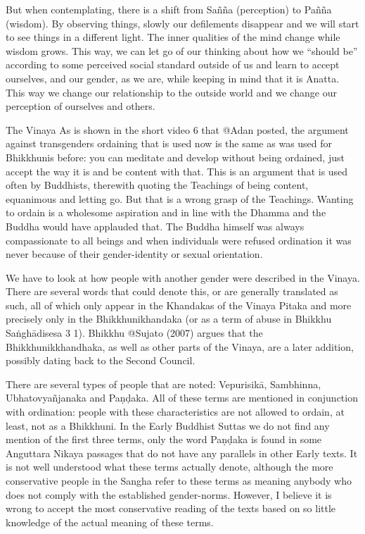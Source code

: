 But when contemplating, there is a shift from Sañña (perception) to Pañña (wisdom). By observing things, slowly our defilements disappear and we will start to see things in a different light. The inner qualities of the mind change while wisdom grows. This way, we can let go of our thinking about how we “should be” according to some perceived social standard outside of us and learn to accept ourselves, and our gender, as we are, while keeping in mind that it is Anatta. This way we change our relationship to the outside world and we change our perception of ourselves and others.

The Vinaya
As is shown in the short video 6 that @Adan posted, the argument against transgenders ordaining that is used now is the same as was used for Bhikkhunis before: you can meditate and develop without being ordained, just accept the way it is and be content with that. This is an argument that is used often by Buddhists, therewith quoting the Teachings of being content, equanimous and letting go. But that is a wrong grasp of the Teachings. Wanting to ordain is a wholesome aspiration and in line with the Dhamma and the Buddha would have applauded that. The Buddha himself was always compassionate to all beings and when individuals were refused ordination it was never because of their gender-identity or sexual orientation.

We have to look at how people with another gender were described in the Vinaya. There are several words that could denote this, or are generally translated as such, all of which only appear in the Khandakas of the Vinaya Pitaka and more precisely only in the Bhikkhunikhandaka (or as a term of abuse in Bhikkhu Saṅghādisesa 3 1). Bhikkhu @Sujato (2007) argues that the Bhikkhunikkhandhaka, as well as other parts of the Vinaya, are a later addition, possibly dating back to the Second Council.

There are several types of people that are noted: Vepurisikā, Sambhinna, Ubhatovyañjanaka and Paṇḍaka.
All of these terms are mentioned in conjunction with ordination: people with these characteristics are not allowed to ordain, at least, not as a Bhikkhuni. In the Early Buddhist Suttas we do not find any mention of the first three terms, only the word Paṇḍaka is found in some Anguttara Nikaya passages that do not have any parallels in other Early texts. It is not well understood what these terms actually denote, although the more conservative people in the Sangha refer to these terms as meaning anybody who does not comply with the established gender-norms. However, I believe it is wrong to accept the most conservative reading of the texts based on so little knowledge of the actual meaning of these terms.

